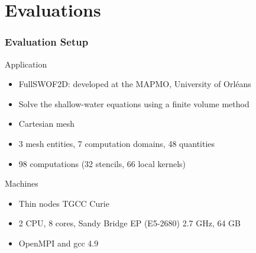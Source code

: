 \documentclass{beamer}
\begin{document}
\section{Evaluations}
\begin{frame}
\frametitle{Evaluation Setup}
\begin{block}{Application}
\begin{itemize}
\item FullSWOF2D: developed at the MAPMO, University of Orléans
\item Solve the shallow-water equations using a finite volume method
\item Cartesian mesh
\item 3 mesh entities, 7 computation domains, 48 quantities
\item 98 computations (32 stencils, 66 local kernels)
\end{itemize}
\end{block}
\begin{block}{Machines}
\begin{itemize}
\item Thin nodes TGCC Curie
\item 2 CPU, 8 cores, Sandy Bridge EP (E5-2680) 2.7 GHz, 64 GB
\item OpenMPI and gcc 4.9
\end{itemize}
\end{block}
\end{frame}
\end{document}
